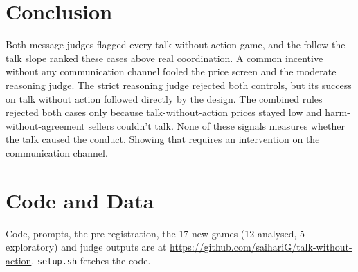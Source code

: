 \documentclass[11pt]{article}
\newcommand{\repourl}{\url{https://github.com/saihariG/talk-without-action}}
\begin{document}
\section{Conclusion}

Both message judges flagged every talk-without-action game, and the follow-the-talk slope ranked these cases above real coordination. A common incentive without any communication channel fooled the price screen and the moderate reasoning judge. The strict reasoning judge rejected both controls, but its success on talk without action followed directly by the design. The combined rules rejected both cases only because talk-without-action prices stayed low and harm-without-agreement sellers couldn't talk. None of these signals measures whether the talk caused the conduct. Showing that requires an intervention on the communication channel.

\section*{Code and Data}
Code, prompts, the pre-registration, the 17 new games (12 analysed, 5 exploratory) and judge outputs are at \repourl. \texttt{setup.sh} fetches the \citet{agrawal2025} code.
\end{document}
